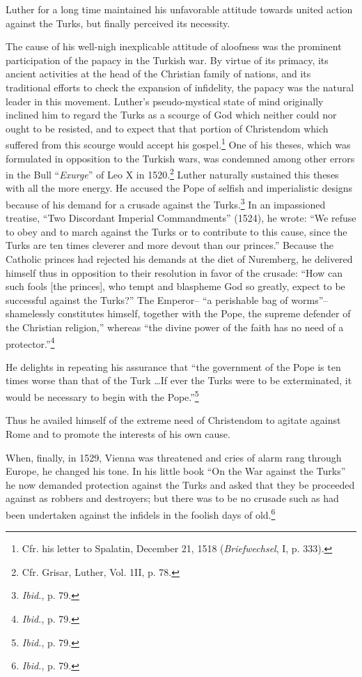 Luther for a long time maintained his unfavorable attitude
towards united action against the Turks, but finally perceived its
necessity.

The cause of his well-nigh inexplicable attitude of aloofness was
the prominent participation of the papacy in the Turkish war. By
virtue of its primacy, its ancient activities at the head of the Christian
family of nations, and its traditional efforts to check the expansion
of infidelity, the papacy was the natural leader in this movement.
Luther’s pseudo-mystical state of mind originally inclined him to regard
the Turks as a scourge of God which neither could nor ought to
be resisted, and to expect that that portion of Christendom which
suffered from this scourge would accept his gospel.\footnote{Cfr. his letter to Spalatin, December 21, 1518 (\textit{Briefwechsel}, I, p. 333).}
One of his
theses, which was formulated in opposition to the Turkish wars, was
condemned among other errors in the Bull “\textit{Exurge}” of Leo X in
1520.\footnote{Cfr. Grisar, Luther, Vol. 1II, p. 78.}
Luther naturally sustained this theses with all the more energy.
He accused the Pope of selfish and imperialistic designs because of
his demand for a crusade against the Turks.\footnote{\textit{Ibid.}, p. 79.}
In an impassioned
treatise, “Two Discordant Imperial Commandments” (1524), he
wrote: “We refuse to obey and to march against the Turks or to
contribute to this cause, since the Turks are ten times cleverer and
more devout than our princes.” Because the Catholic princes had rejected
his demands at the diet of Nuremberg, he delivered himself
thus in opposition to their resolution in favor of the crusade: “How
can such fools [the princes], who tempt and blaspheme God so
greatly, expect to be successful against the Turks?” The Emperor--
“a perishable bag of worms”--shamelessly constitutes himself, together
with the Pope, the supreme defender of the Christian religion,”
whereas “the divine power of the faith has no need of a protector.”\footnote{\textit{Ibid.}, p. 79.}

He delights in repeating his assurance that “the government of the
Pope is ten times worse than that of the Turk \dots If ever the Turks
were to be exterminated, it would be necessary to begin with the
Pope.”\footnote{\textit{Ibid.}, p. 79.}

Thus he availed himself of the extreme need of Christendom to
agitate against Rome and to promote the interests of his own cause.

When, finally, in 1529, Vienna was threatened and cries of alarm
rang through Europe, he changed his tone. In his little book “On the
War against the Turks” he now demanded protection against the
Turks and asked that they be proceeded against as robbers and destroyers;
but there was to be no crusade such as had been undertaken
against the infidels in the foolish days of old.\footnote{\textit{Ibid.}, p. 79.}

